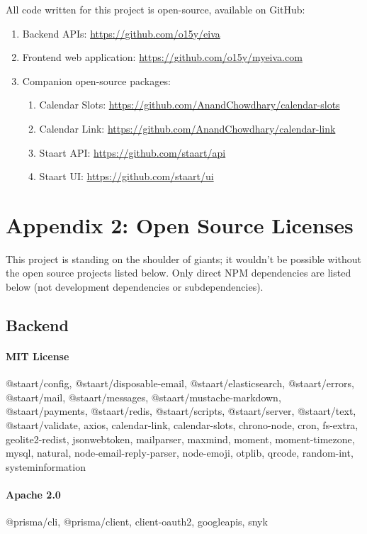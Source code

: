 \documentclass{article}
\begin{document}
All code written for this project is open-source, available on GitHub:

\begin{enumerate}
	\item Backend APIs: \url{https://github.com/o15y/eiva}
	\item Frontend web application: \url{https://github.com/o15y/myeiva.com}
	\item Companion open-source packages:
	\begin{enumerate}
		\item Calendar Slots: \url{https://github.com/AnandChowdhary/calendar-slots}
		\item Calendar Link: \url{https://github.com/AnandChowdhary/calendar-link}
		\item Staart API: \url{https://github.com/staart/api}
		\item Staart UI: \url{https://github.com/staart/ui}
	\end{enumerate}
\end{enumerate}

\newpage

\section*{Appendix 2: Open Source Licenses}

This project is standing on the shoulder of giants; it wouldn't be possible without the open source projects listed below. Only direct NPM dependencies are listed below (not development dependencies or subdependencies).

\subsection*{Backend}

\paragraph{MIT License} @staart/config, @staart/disposable-email, @staart/elasticsearch, @staart/errors, @staart/mail, @staart/messages, @staart/mustache-markdown, @staart/payments, @staart/redis, @staart/scripts, @staart/server, @staart/text, @staart/validate, axios, calendar-link, calendar-slots, chrono-node, cron, fs-extra, geolite2-redist, jsonwebtoken, mailparser, maxmind, moment, moment-timezone, mysql, natural, node-email-reply-parser, node-emoji, otplib, qrcode, random-int, systeminformation

\paragraph{Apache 2.0} @prisma/cli, @prisma/client, client-oauth2, googleapis, snyk
\end{document}
